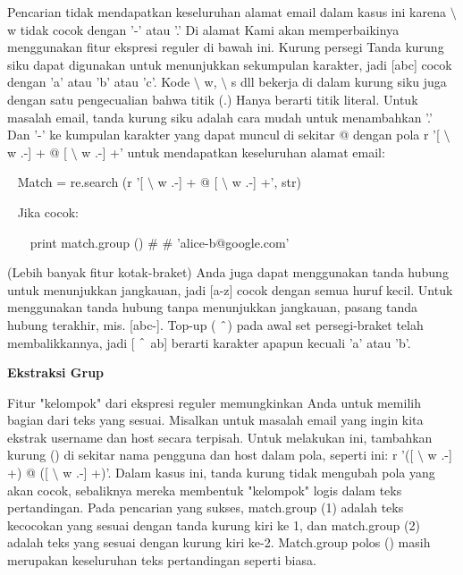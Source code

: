 \begin{12pt}
\begin{12pt}
\begin{12pt}
\begin{12pt}
\begin{12pt}
\begin{12pt}
\begin{12pt}
\vspace{12pt}
Pencarian tidak mendapatkan keseluruhan alamat email dalam kasus ini karena  $  \setminus  $ w tidak cocok dengan '-' atau '.' Di alamat Kami akan memperbaikinya menggunakan fitur ekspresi reguler di bawah ini. Kurung persegi Tanda kurung siku dapat digunakan untuk menunjukkan sekumpulan karakter, jadi [abc] cocok dengan 'a' atau 'b' atau 'c'. Kode  $  \setminus  $ w,  $  \setminus  $ s dll bekerja di dalam kurung siku juga dengan satu pengecualian bahwa titik (.) Hanya berarti titik literal. Untuk masalah email, tanda kurung siku adalah cara mudah untuk menambahkan '.' Dan '-' ke kumpulan karakter yang dapat muncul di sekitar @ dengan pola r '[ $  \setminus  $ w .-] + @ [ $  \setminus  $ w .-] +' untuk mendapatkan keseluruhan alamat email: \par
\vspace{12pt}
\noindent 
~ Match = re.search (r '[ $  \setminus  $ w .-] + @ [ $  \setminus  $ w .-] +', str) \par
\noindent 
~ Jika cocok: \par
\noindent 
~~~ print match.group ()  $  \#  $ $  \#  $ 'alice-b@google.com' \par
\vspace{12pt}
(Lebih banyak fitur kotak-braket) Anda juga dapat menggunakan tanda hubung untuk menunjukkan jangkauan, jadi [a-z] cocok dengan semua huruf kecil. Untuk menggunakan tanda hubung tanpa menunjukkan jangkauan, pasang tanda hubung terakhir, mis. [abc-]. Top-up ( $  \string^  $) pada awal set persegi-braket telah membalikkannya, jadi [ $  \string^  $ ab] berarti karakter apapun kecuali 'a' atau 'b'. \par
\vspace{16pt}
{\fontsize{14pt}{14pt}\selectfont \textbf{Ekstraksi Grup} \\} \par
Fitur "kelompok" dari ekspresi reguler memungkinkan Anda untuk memilih bagian dari teks yang sesuai. Misalkan untuk masalah email yang ingin kita ekstrak username dan host secara terpisah. Untuk melakukan ini, tambahkan kurung () di sekitar nama pengguna dan host dalam pola, seperti ini: r '([ $  \setminus  $ w .-] +) @ ([ $  \setminus  $ w .-] +)'. Dalam kasus ini, tanda kurung tidak mengubah pola yang akan cocok, sebaliknya mereka membentuk "kelompok" logis dalam teks pertandingan. Pada pencarian yang sukses, match.group (1) adalah teks kecocokan yang sesuai dengan tanda kurung kiri ke 1, dan match.group (2) adalah teks yang sesuai dengan kurung kiri ke-2. Match.group polos () masih merupakan keseluruhan teks pertandingan seperti biasa. \par

\end{12pt}
\end{12pt}
\end{12pt}
\end{12pt}
\end{12pt}
\end{12pt}
\end{12pt}
